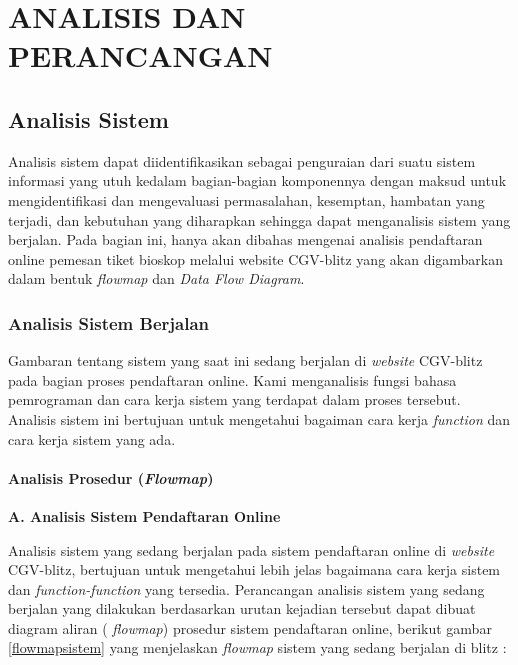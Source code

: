 \chapter{ANALISIS DAN PERANCANGAN}
\section{Analisis Sistem}
\par
Analisis sistem dapat diidentifikasikan sebagai penguraian dari suatu sistem informasi yang utuh kedalam bagian-bagian komponennya dengan maksud untuk mengidentifikasi dan mengevaluasi permasalahan, kesemptan, hambatan yang terjadi, dan kebutuhan yang diharapkan sehingga dapat menganalisis sistem yang berjalan. Pada bagian ini, hanya akan dibahas mengenai analisis pendaftaran online pemesan tiket bioskop melalui website CGV-blitz yang akan digambarkan dalam bentuk \textit{flowmap} dan \textit{Data Flow Diagram}.

\subsection{Analisis Sistem Berjalan}
\par
Gambaran tentang sistem yang saat ini sedang berjalan di \textit{website} CGV-blitz pada bagian proses pendaftaran online. Kami menganalisis fungsi bahasa pemrograman dan cara kerja sistem yang terdapat dalam proses tersebut. Analisis sistem ini bertujuan untuk mengetahui bagaiman cara kerja \textit{function} dan cara kerja sistem yang ada. 

\subsubsection{Analisis Prosedur (\textit{Flowmap})}
\textbf{A.	Analisis Sistem Pendaftaran Online}
\par
Analisis sistem yang sedang berjalan pada sistem pendaftaran online di \textit{website} CGV-blitz, bertujuan untuk mengetahui lebih jelas bagaimana cara kerja sistem dan \textit{function-function} yang tersedia. Perancangan analisis sistem yang sedang berjalan yang dilakukan berdasarkan urutan kejadian tersebut dapat dibuat diagram aliran ( \textit{flowmap}) prosedur sistem pendaftaran online, berikut gambar \ref{flowmapsistem} yang menjelaskan \textit{flowmap} sistem yang sedang berjalan di blitz : \\
\\
\\
\\

